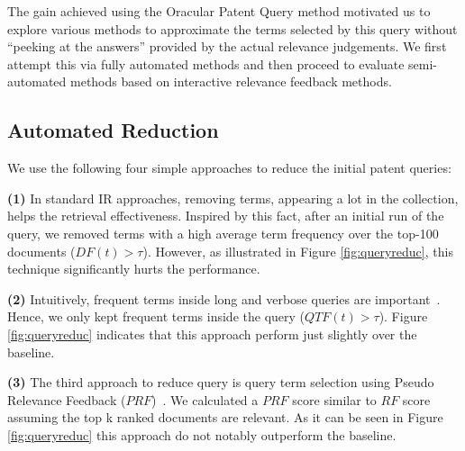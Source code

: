 The gain achieved using the Oracular Patent Query method motivated us to explore various methods to approximate the terms
selected by this query without ``peeking at the answers'' provided by
the actual relevance judgements.  We first attempt this via fully
automated methods and then proceed to evaluate semi-automated methods
based on interactive relevance feedback methods.

\subsection{Automated Reduction}
\label{sec:AutomatedReduction}
%
We use the following four simple approaches to reduce the initial patent queries: 

\vspace*{1mm}
\noindent \textbf{(1)} In standard IR approaches, removing terms, appearing a lot in the collection, helps the retrieval effectiveness. Inspired by this fact, after an initial run of the query, we removed terms  with a high average term frequency over the top-100 documents ($DF(t)>\tau$). However, as illustrated in Figure \ref{fig:queryreduc}, this technique significantly hurts the performance.  

\vspace*{1mm}
\noindent \textbf{(2)} Intuitively, frequent terms inside long and verbose queries are  important~\cite{maxwell2013compact}. Hence, we only kept frequent terms inside the query ($QTF(t)>\tau$).  Figure \ref{fig:queryreduc} indicates that this approach perform just slightly over the baseline.

\vspace*{1mm}
\noindent \textbf{(3)} The third approach to reduce query is query term selection using Pseudo Relevance Feedback ($\mathit{PRF}$)~\cite{Baeza-Yates2011, maxwell2013compact}. We calculated a $\mathit{PRF}$ score similar to $\mathit{RF}$ score assuming the top k ranked documents are relevant. As it can be seen in Figure \ref{fig:queryreduc} this approach do not notably outperform the baseline. 

